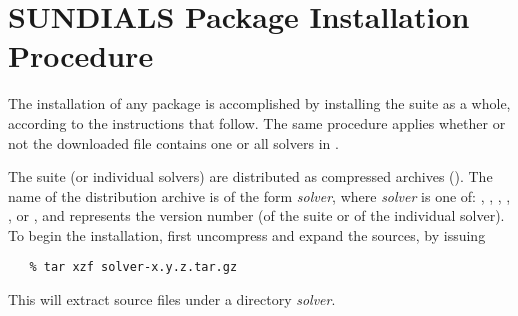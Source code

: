 \chapter{SUNDIALS Package Installation Procedure}\label{c:install}

The installation of any {\sundials} package is accomplished by installing the
{\sundials} suite as a whole, according to the instructions that
follow. The same procedure applies whether or not the downloaded
file contains one or all solvers in {\sundials}.

The {\sundials} suite (or individual solvers) are distributed as
compressed archives (). The name of the distribution
archive is of the form {\em solver}, where {\em
solver} is one of: , , , ,
, or , and  represents the version number
(of the {\sundials} suite or of the individual solver).
To begin the installation, first uncompress and expand the sources, by issuing
\begin{verbatim}
   % tar xzf solver-x.y.z.tar.gz
\end{verbatim}
This will extract source files under a directory {\em solver}.

